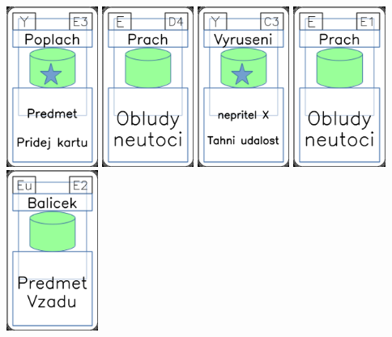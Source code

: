 \documentclass[a4paper]{article}
\begin{document}
	\includegraphics[width=3.0cm]{img-5_22}
	\includegraphics[width=3.0cm]{img-4_48}
	\includegraphics[width=3.0cm]{img-5_42}
	\includegraphics[width=3.0cm]{img-4_50}
	\includegraphics[width=3.0cm]{img-4_21}
\end{document}
